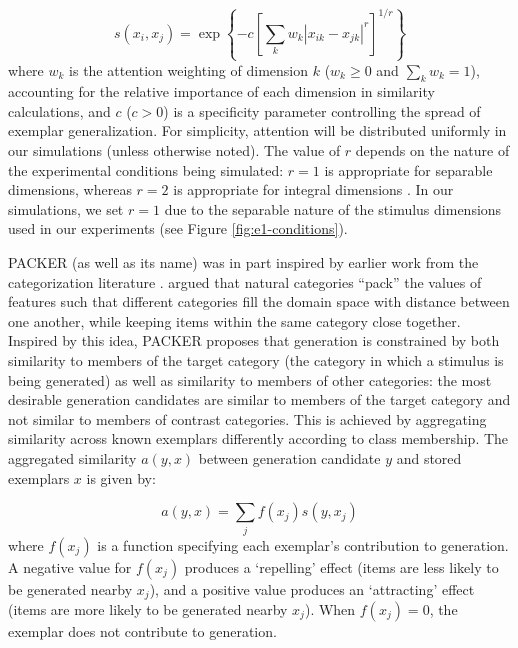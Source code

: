 \documentclass[12pt]{article}
\begin{document}
\begin{flushleft}
\begin{equation} s\left(x_i,x_j\right) = \exp \left\{ -c \left[\sum_{k}{ w_k
\left| x_{ik} - x_{jk} \right|^r }\right]^{1/r} \right\}
\label{eq:similarity}
\end{equation}
% 
where $w_k$ is the attention weighting of dimension $k$ ($w_k \geq 0$ and
$\sum_k{w_k} = 1$), accounting for the relative importance of each dimension in
similarity calculations, and $c$ ($c>0$) is a specificity parameter controlling
the spread of exemplar generalization. For simplicity, attention will be
distributed uniformly in our simulations (unless otherwise noted). The value of
$r$ depends on the nature of the experimental conditions being simulated: $r=1$
is appropriate for separable dimensions, whereas $r=2$ is appropriate for
integral dimensions \citep[e.g.,][]{shepard1964attention,garner1974processing}.
In our simulations, we set $r=1$ due to the separable nature of the stimulus
dimensions used in our experiments (see Figure \ref{fig:e1-conditions}).

PACKER (as well as its name) was in part inspired by earlier work from the
categorization literature \citep{hidaka2011packing,stewart2005}. \citet{hidaka2011packing} argued that
natural categories ``pack'' the values of features such that different
categories fill the domain space with distance between one another, while
keeping items within the same category close together. Inspired by this idea,
PACKER proposes that generation is constrained by both similarity to members of
the target category (the category in which a stimulus is being generated) as
well as similarity to members of other categories: the most desirable generation
candidates are similar to members of the target category and not similar to
members of contrast categories. This is achieved by aggregating similarity
across known exemplars differently according to class membership. The aggregated
similarity $a(y,x)$ between generation candidate $y$ and stored exemplars $x$ is
given by:

\begin{equation} a(y, x) = \sum_j{f(x_j) s(y, x_j)}
\end{equation}
% 
where $f(x_j)$ is a function specifying each exemplar's contribution to
generation. A negative value for $f(x_j)$ produces a `repelling' effect (items
are less likely to be generated nearby $x_j$), and a positive value produces an
`attracting' effect (items are more likely to be generated nearby $x_j$). When
$f(x_j)=0$, the exemplar does not contribute to generation.


\end{flushleft}
\end{document}
